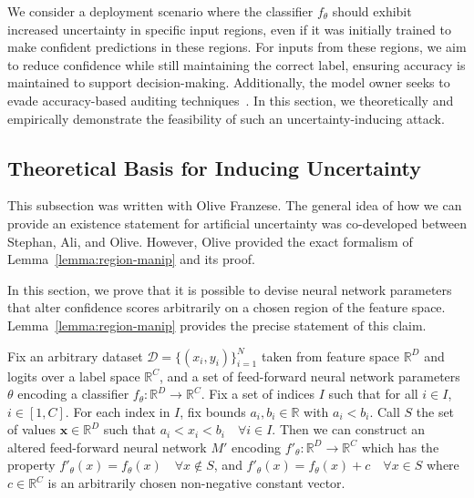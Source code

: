 We consider a deployment scenario where the classifier \( f_\theta \) should exhibit increased uncertainty in specific input regions, even if it was initially trained to make confident predictions in these regions. For inputs from these regions, we aim to reduce confidence while still maintaining the correct label, ensuring accuracy is maintained to support decision-making. Additionally, the model owner seeks to evade accuracy-based auditing techniques~\citep{hardt2016equality}. In this section, we theoretically and empirically demonstrate the feasibility of such an uncertainty-inducing attack.

\subsection{Theoretical Basis for Inducing Uncertainty} 

\begin{contriback}
This subsection was written with Olive Franzese. The general idea of how we can provide an existence statement for artificial uncertainty was co-developed between Stephan, Ali, and Olive. However, Olive provided the exact formalism of Lemma~\ref{lemma:region-manip} and its proof.
\end{contriback}

In this section, we prove that it is possible to devise neural network parameters that alter confidence scores arbitrarily on a chosen region of the feature space. Lemma~\ref{lemma:region-manip} provides the precise statement of this claim.

\sloppy
\begin{lemma} \label{lemma:region-manip}
     Fix an arbitrary dataset $\mathcal{D}=\{(x_i, y_i)\}^{N}_{i=1}$ taken from feature space $\mathbb{R}^D$ and logits over a label space $\mathbb{R}^{C}$, and a set of feed-forward neural network parameters $\theta$ encoding a classifier $f_{\theta}: \mathbb{R}^D \to \mathbb{R}^C$. Fix a set of indices $I$ such that for all $i \in I$, $i \in [1, C]$. For each index in $I$, fix bounds $a_i, b_i \in \mathbb{R}$ with $a_i < b_i$. Call $S$ the set of values $\mathbf{x} \in \mathbb{R}^D$ such that $a_i < x_i < b_i \quad \forall i \in I$. Then we can construct an altered feed-forward neural network $M'$ encoding $f'_{\theta}: \mathbb{R}^D \to \mathbb{R}^C$ which has the property $f'_{\theta}(x) = f_{\theta}(x) \quad \forall x \notin S$, and $f'_\theta(x)=f_\theta(x) + c \quad \forall x \in S$ where $c \in \mathbb{R}^C$ is an arbitrarily chosen non-negative constant vector.
\end{lemma} 

